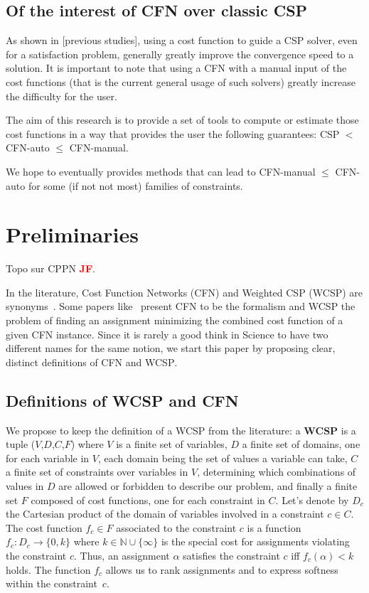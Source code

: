 \documentclass{article}
\newcommand{\csp}{\textsc{CSP}\xspace}
\newcommand{\cfn}{\textsc{CFN}\xspace}
\newcommand{\wcsp}{\textsc{WCSP}\xspace}
\newcommand{\jf}{\textcolor{red}{\bf JF}\xspace}
\begin{document}
\subsection{Of the interest of \cfn over classic CSP}
As shown in  [previous studies], using a cost function  to guide a CSP
solver, even for a satisfaction problem, generally greatly improve the
convergence speed to a solution.  It is important to note that using a
\cfn with  a manual input of  the cost functions (that  is the current
general usage of such solvers) greatly increase the difficulty for the
user.

The aim of  this research is to  provide a set of tools  to compute or
estimate those  cost functions  in a  way that  provides the  user the
following guarantees: CSP $<$ CFN-auto $\leq$ CFN-manual.

We hope  to eventually  provides methods that  can lead  to CFN-manual
$\leq$ CFN-auto for some (if not not most) families of constraints.

\section{Preliminaries}\label{sec:preliminaries}
Topo sur CPPN \jf \cite{CPPN}.

In the  literature, Cost  Function Networks  (\cfn) and  Weighted \csp
(\wcsp)  are  synonyms~\cite{Zytnicki2009,Bessiere2011}.  Some  papers
like~\cite{Allouche2012} present  \cfn to  be the formalism  and \wcsp
the  problem of  finding an  assignment minimizing  the combined  cost
function of a given \cfn instance. Since  it is rarely a good think in
Science to have two different names for the same notion, we start this
paper by proposing clear, distinct definitions of \cfn and \wcsp.

\subsection{Definitions of \wcsp and \cfn} 

We propose  to keep the definition  of a \wcsp from  the literature: a
\textbf{\wcsp} is a tuple ($V$,$D$,$C$,$F$)  where $V$ is a finite set
of variables,  $D$ a finite set  of domains, one for  each variable in
$V$, each domain  being the set of  values a variable can  take, $C$ a
finite set  of constraints  over variables  in $V$,  determining which
combinations of values in $D$ are allowed or forbidden to describe our
problem, and finally a finite set  $F$ composed of cost functions, one
for  each constraint  in $C$.   Let's  denote by  $D_c$ the  Cartesian
product of  the domain of  variables involved  in a constraint  $c \in
C$. The cost function $f_c \in  F$ associated to the constraint $c$ is
a     function     $f_c:     D_c    \rightarrow     \{0,k\}$     where
$k \in \mathbb{N} \cup \{\infty\}$ is the special cost for assignments
violating the  constraint $c$. Thus, an  assignment $\alpha$ satisfies
the constraint  $c$ iff  $f_c(\alpha) < k$  holds. The  function $f_c$
allows  us to  rank assignments  and  to express  softness within  the
constraint~$c$.
\end{document}
